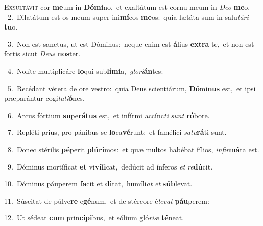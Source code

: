\lettrine{\initial\textcolor{\initialcolor}{E}}{xsultávit} cor \textbf{me}\-um in \textbf{Dó}\-\textbf{mi}no,~\star et exaltátum est cornu meum in \textit{De}\-\textit{o} \textbf{me}\-o.\\
{\numbfont\textcolor{\numbcolor}{~2.}}~Dilatátum est os meum super ini\-\textbf{mí}\-cos \textbf{me}\-os:~\star quia lætáta sum in salu\-\textit{tá}\-\textit{ri} \textbf{tu}\-o.\par
{\numbfont\textcolor{\numbcolor}{~3.}}~Non est sanctus, ut est Dóminus:~\dagger neque enim est \textbf{á}\-lius \textbf{ex}\-\textbf{tra} te,~\star et non est fortis sicut \textit{De}\-\textit{us} \textbf{nos}\-ter.\par
{\numbfont\textcolor{\numbcolor}{~4.}}~Nolíte multiplicáre \textbf{lo}\-qui sub\-\textbf{lí}\-\textbf{mi}a,~\star \textit{glo}\-\textit{ri}\textbf{án}tes:\par
{\numbfont\textcolor{\numbcolor}{~5.}}~Recédant vétera de ore vestro:~\dagger quia Deus scientiárum, \textbf{Dó}\-mi\textbf{nus} est,~\star et ipsi præparántur cogi\-\textit{ta}\-\textit{ti}\textbf{ó}nes.\par
{\numbfont\textcolor{\numbcolor}{~6.}}~Arcus fórtium \textbf{su}\-pe\-\textbf{rá}\-\textbf{tus} est,~\star et infírmi accínc\textit{ti} \textit{sunt} \textbf{ró}\-bore.\par
{\numbfont\textcolor{\numbcolor}{~7.}}~Repléti prius, pro pánibus se \textbf{lo}\-ca\-\textbf{vé}\-runt:~\star et famélici \textit{sa}\-\textit{tu}\textbf{rá}ti sunt.\par
{\numbfont\textcolor{\numbcolor}{~8.}}~Donec stérilis \textbf{pé}\-perit \textbf{plú}\-\textbf{ri}mos:~\star et quæ multos habébat fílios, \textit{in}\-\textit{fir}\textbf{má}ta est.\par
{\numbfont\textcolor{\numbcolor}{~9.}}~Dóminus mortíficat \textbf{et} vi\-\textbf{ví}\-\textbf{fi}cat,~\star dedúcit ad ínferos \textit{et} \textit{re}\-\textbf{dú}cit.\par
{\numbfont\textcolor{\numbcolor}{10.}}~Dóminus páuperem \textbf{fa}\-cit et \textbf{di}\-tat,~\star humíli\textit{at} \textit{et} \textbf{súb}\-levat.\par
{\numbfont\textcolor{\numbcolor}{11.}}~Súscitat de púlve\textbf{re} e\-\textbf{gé}\-num,~\star et de stércore é\-\textit{le}\-\textit{vat} \textbf{páu}\-perem:\par
{\numbfont\textcolor{\numbcolor}{12.}}~Ut sédeat \textbf{cum} prin\-\textbf{cí}\-\textbf{pi}bus,~\star et sólium gló\-\textit{ri}\-\textit{æ} \textbf{té}\-neat.\par
